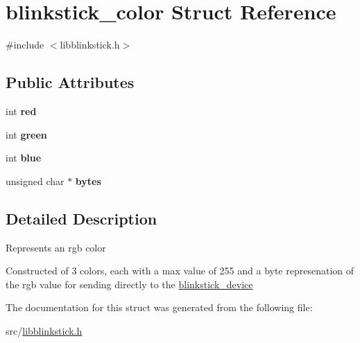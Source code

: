 \hypertarget{structblinkstick__color}{}\section{blinkstick\+\_\+color Struct Reference}
\label{structblinkstick__color}


{\ttfamily \#include $<$libblinkstick.\+h$>$}

\subsection*{Public Attributes}
\begin{DoxyCompactItemize}
\item 
\mbox{\label{structblinkstick__color_aa84510426394164692d5e91086d40b8f}} 
int {\bfseries red}
\item 
\mbox{\label{structblinkstick__color_a7a933e7c0936e772f2f03dd5c0b5a8d3}} 
int {\bfseries green}
\item 
\mbox{\label{structblinkstick__color_a6b9d1839aeb150800183fe5205d81193}} 
int {\bfseries blue}
\item 
\mbox{\label{structblinkstick__color_a13d55c5d2728157d63a94b7201014456}} 
unsigned char $\ast$ {\bfseries bytes}
\end{DoxyCompactItemize}


\subsection{Detailed Description}
Represents an rgb color

Constructed of 3 colors, each with a max value of 255 and a byte represenation of the rgb value for sending directly to the \hyperlink{structblinkstick__device}{blinkstick\+\_\+device} 

The documentation for this struct was generated from the following file\+:\begin{DoxyCompactItemize}
\item 
src/\hyperlink{libblinkstick_8h}{libblinkstick.\+h}\end{DoxyCompactItemize}
